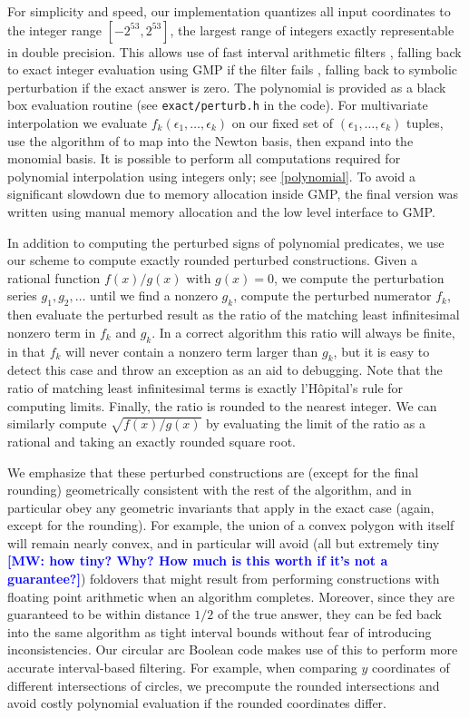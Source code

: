 \documentclass[11pt]{article}
\newcommand{\MW}[1]{\textcolor{blue}{\bf[MW: #1]}}
\begin{document}
For simplicity and speed, our implementation quantizes all input coordinates to the integer range $[-2^{53},2^{53}]$, the largest range of integers exactly representable in
double precision.  This allows use of fast interval arithmetic filters \cite{bronnimann2001interval}, falling back to exact integer evaluation using GMP if the filter fails \cite{granlund2012gmp},
falling back to symbolic perturbation if the exact answer is zero.  The polynomial is provided as a black box evaluation routine (see \verb+exact/perturb.h+ in the code).  For multivariate
interpolation we evaluate $f_k(\epsilon_1, \ldots, \epsilon_k)$ on our fixed set of $(\epsilon_1, \ldots, \epsilon_k)$ tuples, use the algorithm of \cite{neidinger2009multivariable}
to map into the Newton basis, then expand into the monomial basis.  It is possible to perform all computations required for polynomial interpolation using integers only; see \autoref{polynomial}.
To avoid a significant slowdown due to memory allocation inside GMP, the final version was written using manual memory allocation and the low level interface to GMP.

In addition to computing the perturbed signs of polynomial predicates, we use our scheme to compute exactly rounded perturbed constructions.  Given a rational function $f(x)/g(x)$
with $g(x) = 0$, we compute the perturbation series $g_1, g_2, \ldots$ until we find a nonzero $g_k$, compute the perturbed numerator $f_k$, then evaluate the perturbed result as
the ratio of the matching least infinitesimal nonzero term in $f_k$ and $g_k$.  In a correct algorithm this ratio will always be finite, in that $f_k$ will never contain a nonzero term
larger than $g_k$, but it is easy to detect this case and throw an exception as an aid to debugging.  Note that the ratio of matching least infinitesimal terms is exactly l'H\^opital's
rule for computing limits.  Finally, the ratio is rounded to the nearest integer.  We can similarly compute $\sqrt{f(x)/g(x)}$ by evaluating the limit of the ratio as a rational and
taking an exactly rounded square root.

We emphasize that these perturbed constructions are (except for the final rounding) geometrically consistent with the rest of the algorithm, and in particular obey any geometric
invariants that apply in the exact case (again, except for the rounding).  For example, the union of a convex polygon with itself will remain nearly convex, and in particular will
avoid (all but extremely tiny \MW{how tiny? Why? How much is this worth if it's not a guarantee?}) foldovers that might result from performing constructions with floating point arithmetic when an algorithm completes.  Moreover, since they
are guaranteed to be within distance $1/2$ of the true answer, they can be fed back into the same algorithm as tight interval bounds without fear of introducing inconsistencies.  Our
circular arc Boolean code makes use of this to perform more accurate interval-based filtering.  For example, when comparing $y$ coordinates of different intersections of circles,
we precompute the rounded intersections and avoid costly polynomial evaluation if the rounded coordinates differ.
\end{document}
